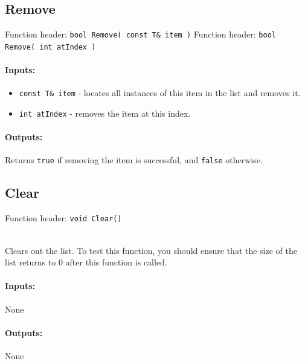     \begin{framed}
    \subsection{Remove}

    Function header: \texttt{bool    Remove( const T\& item )}
    Function header: \texttt{bool    Remove( int atIndex )}

    \paragraph{Inputs:}
        \begin{itemize}
            \item   \texttt{const T\& item} - locates all instances of this item in the list and removes it.
            \item   \texttt{int atIndex} - removes the item at this index.
        \end{itemize}

    \paragraph{Outputs:}
        Returns \texttt{true} if removing the item is successful, and \texttt{false} otherwise.

    \end{framed}
    
    \begin{framed}
    \subsection{Clear}

    Function header: \texttt{void    Clear()}

    ~\\ Clears out the list. To test this function, you should ensure that
    the size of the list returns to 0 after this function is called.

    \paragraph{Inputs:}
        None

    \paragraph{Outputs:}
        None

    \end{framed}
    
